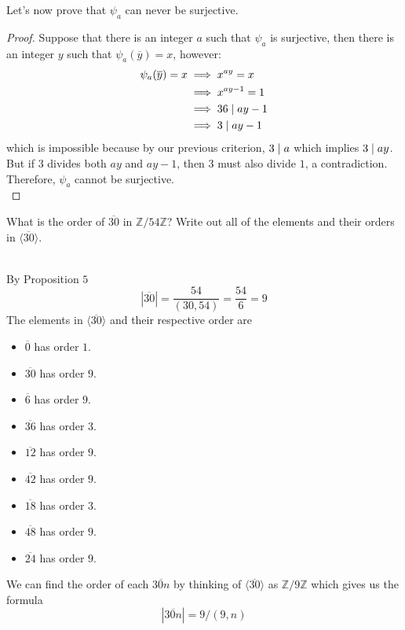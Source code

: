 \begin{solution}
    Let's now prove that $\psi_a$ can never be surjective.
    \begin{proof}
        Suppose that there is an integer $a$ such that $\psi_a$ is
        surjective, then there is an integer $y$ such that $\psi_a(
        \overline{y})=x$, however:
        \begin{align*}
            \psi_a(\overline{y})=x &\implies x^{ay}=x \\
            &\implies x^{ay-1}=1 \\
            &\implies 36 \mathrel{|} ay-1 \\
            &\implies 3\mathrel{|} ay-1
        \end{align*}
        which is impossible because by our previous criterion, $3\mathrel{|} a$
        which implies $3\mathrel{|} ay$. But if $3$ divides both $ay$ and $ay-1$,
        then $3$ must also divide $1$, a contradiction. Therefore, $\psi_a$
        cannot be surjective.\\
    \end{proof}
\end{solution}

\begin{exercise}
    What is the order of $\overline{30}$ in $\mathbb{Z}/54\mathbb{Z}$?
    Write out all of the elements and their orders in $\langle\overline{30}
    \rangle$.\\
\end{exercise}

\begin{solution}
    \\ By Proposition $5$
    $$|\overline{30}| = \frac{54}{(30,54)} = \frac{54}{6} = 9$$
    The elements in $\langle \overline{30} \rangle$ and their respective
    order are
    \begin{itemize}
        \item $\overline{0}$ has order $1$.
        \item $\overline{30}$ has order $9$.
        \item $\overline{6}$ has order $9$.
        \item $\overline{36}$ has order $3$.
        \item $\overline{12}$ has order $9$.
        \item $\overline{42}$ has order $9$.
        \item $\overline{18}$ has order $3$.
        \item $\overline{48}$ has order $9$.
        \item $\overline{24}$ has order $9$.
    \end{itemize}
    We can find the order of each $\overline{30n}$ by thinking of
    $\langle \overline{30} \rangle$ as $\mathbb{Z}/9\mathbb{Z}$ which
    gives us the formula
    $$|\overline{30n}| = 9/(9,n)$$
\end{solution}

